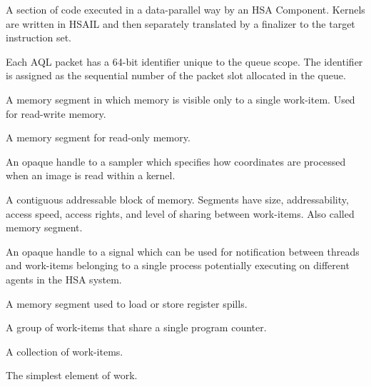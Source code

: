 \documentclass[final,oneside]{book}
\begin{document}
\begin{description}[itemsep=5pt,leftmargin=0cm, labelindent=0cm]
\item[Kernel] A section of code executed in a data-parallel way by an HSA
  Component. Kernels are written in HSAIL and then separately translated by a
  finalizer to the target instruction set.

\item[Packet ID] Each AQL packet has a 64-bit identifier unique to the queue
  scope. The identifier is assigned as the sequential number of the packet slot
  allocated in the queue.

\item[Private segment] A memory segment in which memory is visible only to a
  single work-item. Used for read-write memory.

\item[Readonly segment] A memory segment for read-only memory.

\item[Sampler handle] An opaque handle to a sampler which specifies how
  coordinates are processed when an image is read within a kernel.

\item[Segment] A contiguous addressable block of memory. Segments have size,
  addressability, access speed, access rights, and level of sharing between
  work-items. Also called memory segment.

\item[Signal (handle)] An opaque handle to a signal which can be used for
  notification between threads and work-items belonging to a single process
  potentially executing on different agents in the HSA system.

\item[Spill segment] A memory segment used to load or store register spills.

\item[Wavefront] A group of work-items that share a single program counter.

\item[Work-group] A collection of work-items.

\item[Work-item] The simplest element of work.

\end{description}

\newpage
{}
\printindex[api]
\printindex[ext]


\begin{thebibliography}{30}



\end{thebibliography}
\end{document}
